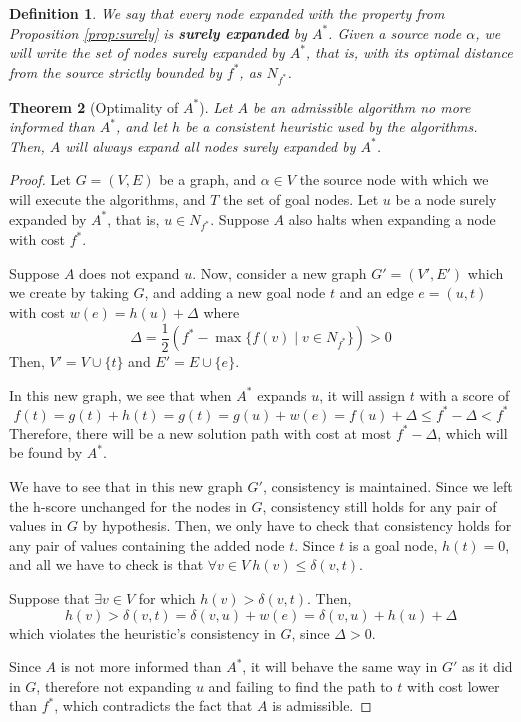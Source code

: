 \documentclass[a4paper,10pt]{report}
\newtheorem{theorem}{Theorem}[chapter]
\newtheorem{definition}[theorem]{Definition}
\begin{document}
\begin{definition}
We say that every node expanded with the property from Proposition \ref{prop:surely} is \textbf{surely expanded} by $A^*$. Given a source node $\alpha$, we will write the set of nodes surely expanded by $A^*$, that is, with its optimal distance from the source strictly bounded by $f^*$, as $N_{f^*}$.
\end{definition}

\begin{theorem}[Optimality of $A^*$]
\label{thm:astar-optimality}
Let $A$ be an admissible algorithm no more informed than $A^*$, and let $h$ be a consistent heuristic used by the algorithms. Then, $A$ will always expand all nodes surely expanded by $A^*$.
\end{theorem}
\begin{proof}
Let $G = (V, E)$ be a graph, and $\alpha \in V$ the source node with which we will execute the algorithms, and $T$ the set of goal nodes. Let $u$ be a node surely expanded by $A^*$, that is, $u \in N_{f^*}$. Suppose $A$ also halts when expanding a node with cost $f^*$.

Suppose $A$ does not expand $u$. Now, consider a new graph $G' = (V', E')$ which we create by taking $G$, and adding a new goal node $t$ and an edge $e = (u, t)$ with cost $w(e) = h(u) + \Delta$ where
\[ \Delta = \frac{1}{2} (f^* - \max \{ f(v) \mid v \in N_{f^*} \}) > 0 \]
Then, $V' = V \cup \{ t 	\}$ and $E' = E \cup \{ e \}$.

In this new graph, we see that when $A^*$ expands $u$, it will assign $t$ with a score of
\[ f(t) = g(t) + h(t) = g(t) = g(u) + w(e) = f(u) + \Delta \leq f^* - \Delta < f^* \]
Therefore, there will be a new solution path with cost at most $f^* - \Delta$, which will be found by $A^*$.

We have to see that in this new graph $G'$, consistency is maintained. Since we left the h-score unchanged for the nodes in $G$, consistency still holds for any pair of values in $G$ by hypothesis. Then, we only have to check that consistency holds for any pair of values containing the added node $t$. Since $t$ is a goal node, $h(t) = 0$, and all we have to check is that $\forall v \in V \  h(v) \leq \delta(v, t)$.

Suppose that $\exists v \in V$ for which $h(v) > \delta(v, t)$. Then,
\[ h(v) > \delta(v, t) = \delta(v, u) + w(e) = \delta(v, u) + h(u) + \Delta \]
which violates the heuristic's consistency in $G$, since $\Delta > 0$.

Since $A$ is not more informed than $A^*$, it will behave the same way in $G'$ as it did in $G$, therefore not expanding $u$ and failing to find the path to $t$ with cost lower than $f^*$, which contradicts the fact that $A$ is admissible.
\end{proof}
\end{document}
